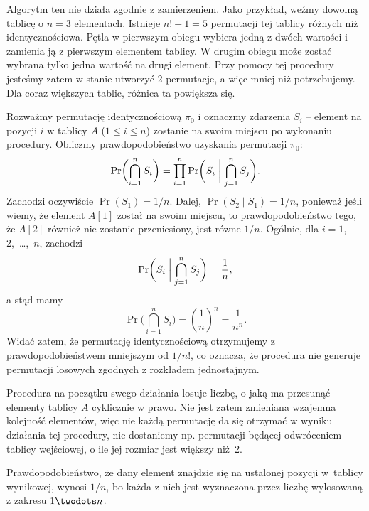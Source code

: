\exercise %

Algorytm ten nie działa zgodnie z zamierzeniem. Jako przykład, weźmy dowolną tablicę o $n=3$ elementach. Istnieje $n!-1=5$ permutacji tej tablicy różnych niż identycznościowa. Pętla  w pierwszym obiegu wybiera jedną z dwóch wartości i zamienia ją z pierwszym elementem tablicy. W drugim obiegu może zostać wybrana tylko jedna wartość na drugi element. Przy pomocy tej procedury jesteśmy zatem w stanie utworzyć 2 permutacje, a więc mniej niż potrzebujemy. Dla coraz większych tablic, różnica ta powiększa się.

\exercise %
Rozważmy permutację identycznościową $\pi_0$ i oznaczmy zdarzenia $S_i$ -- element na pozycji $i$ w tablicy $A$ ($1\le i\le n$) zostanie na swoim miejscu po wykonaniu procedury. Obliczmy prawdopodobieństwo uzyskania permutacji $\pi_0$:
\[
	\Pr\biggl(\bigcap_{i=1}^nS_i\biggr) = \prod_{i=1}^n\Pr\biggl(S_i\biggm|\bigcap_{j=1}^nS_j\biggr).
\]
Zachodzi oczywiście $\Pr(S_1)=1/n$. Dalej, $\Pr(S_2\mid S_1)=1/n$, ponieważ jeśli wiemy, że element $A[1]$ został na swoim miejscu, to prawdopodobieństwo tego, że $A[2]$ również nie zostanie przeniesiony, jest równe $1/n$. Ogólnie, dla $i=1$, 2,~\dots,~$n$, zachodzi
\[
	\Pr\biggl(S_i\biggm|\bigcap_{j=1}^nS_j\biggr) = \frac{1}{n},
\]
a stąd mamy
\[
	\Pr\biggl(\bigcap_{i=1}^nS_i\biggr) = \left(\frac{1}{n}\right)^n = \frac{1}{n^n}.
\]
Widać zatem, że permutację identycznościową otrzymujemy z prawdopodobieństwem mniejszym od $1/n!$, co oznacza, że procedura  nie generuje permutacji losowych zgodnych z rozkładem jednostajnym.

\exercise %
Procedura na początku swego działania losuje liczbę, o jaką ma przesunąć elementy tablicy $A$ cyklicznie w prawo. Nie jest zatem zmieniana wzajemna kolejność elementów, więc nie każdą permutację da się otrzymać w wyniku działania tej procedury, nie dostaniemy np. permutacji będącej odwróceniem tablicy wejściowej, o ile jej rozmiar jest większy niż~2.

Prawdopodobieństwo, że dany element znajdzie się na ustalonej pozycji w~tablicy wynikowej, wynosi $1/n$, bo każda z nich jest wyznaczona przez liczbę wylosowaną z zakresu $1\twodots n$.

